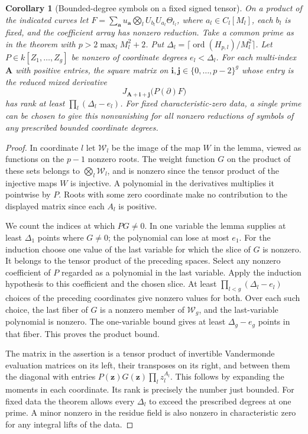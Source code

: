 \documentclass[a4paper,11pt]{article}
\newtheorem{corollary}[proposition]{Corollary}
\theoremstyle{definition}
\theoremstyle{remark}
\numberwithin{equation}{section}
\begin{document}
\begin{corollary}[Bounded-degree symbols on a fixed signed tensor]\leavevmode
\label{cor:projectsymbol483}
On a product of the indicated curves let
\(F=\sum_{\boldsymbol a}u_{\boldsymbol a}
\bigotimes_l U_{b_l}U_{a_l}\Theta_{t_l}\),
where \(a_l\in C_l[M_l]\), each \(b_l\) is fixed, and the
coefficient array has nonzero reduction. Take a common prime
as in the theorem with \(p>2\max_l M_l^2+2\). Put
\(\Delta_l=\lceil\operatorname{ord}(H_{p,l})/M_l^2\rceil\).
Let \(P\in k[Z_1,\ldots,Z_g]\) be nonzero of coordinate degrees
\(e_l<\Delta_l\).
For each multi-index \(\boldsymbol A\) with positive entries, the
square matrix on \(\boldsymbol i,\boldsymbol j\in\{0,\ldots,p-2\}^g\)
whose entry is the reduced mixed derivative
\[
              J_{\boldsymbol A+\boldsymbol i+\boldsymbol j}
                       \bigl(P(\partial)F\bigr)
\]
has rank at least \(\prod_l(\Delta_l-e_l)\). For fixed
characteristic-zero data, a single prime can be chosen to give
this nonvanishing for all nonzero reductions of symbols of any
prescribed bounded coordinate degrees.
\end{corollary}
\begin{proof}
In coordinate \(l\) let \(\mathcal W_l\) be the image of the
map \(W\) in the lemma, viewed as functions on the \(p-1\)
nonzero roots. The weight function \(G\) on the product of these
sets belongs to \(\bigotimes_l\mathcal W_l\), and is nonzero since
the tensor product of the injective maps \(W\) is injective.
A polynomial in the derivatives multiplies it pointwise by \(P\).
Roots with some zero coordinate make no contribution to the
displayed matrix since each \(A_l\) is positive.

We count the indices at which \(PG\ne0\). In one variable the
lemma supplies at least \(\Delta_1\) points where \(G\ne0\);
the polynomial can lose at most \(e_1\). For the induction choose
one value of the last variable for which the slice of \(G\) is
nonzero. It belongs to the tensor product of the preceding
spaces. Select any nonzero coefficient of \(P\) regarded as
a polynomial in the last variable. Apply the induction
hypothesis to this coefficient and the chosen slice. At least
\(\prod_{l<g}(\Delta_l-e_l)\) choices of the preceding coordinates
give nonzero values for both. Over each such choice, the last
fiber of \(G\) is a nonzero member of \(\mathcal W_g\), and
the last-variable polynomial is nonzero. The one-variable
bound gives at least \(\Delta_g-e_g\) points in that fiber.
This proves the product bound.

The matrix in the assertion is a tensor product of invertible
Vandermonde evaluation matrices on its left, their transposes on
its right, and between them the diagonal with entries
\(P(\boldsymbol z)G(\boldsymbol z)\prod_l z_l^{A_l}\).
This follows by expanding the moments in each coordinate.
Its rank is precisely the number just bounded. For fixed data
the theorem allows every \(\Delta_l\) to exceed the prescribed
degrees at one prime. A minor nonzero in the residue field is
also nonzero in characteristic zero for any integral lifts of
the data.
\end{proof}
\end{document}

